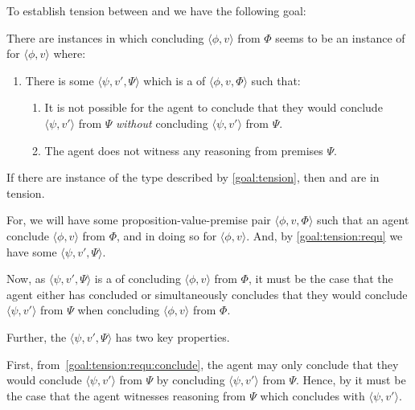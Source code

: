 \begin{note}[Goal]
  To establish tension between \ESU{} and \csN{} we have the following goal:

  \begin{goal}
    \label{goal:tension}
    There are instances in which concluding \(\langle \phi,v \rangle\) from \(\Phi\) seems to be an instance of \csN{} for \(\langle \phi,v \rangle\) where:
    \begin{enumerate}[label=\arabic*., ref=\named{G\ref{goal:tension}:\arabic*}]
    \item
      \label{goal:tension:requ}
      There is some \(\langle \psi,v',\Psi \rangle\) which is a \requ{} of \(\langle \phi,v,\Phi \rangle\) such that:
      \begin{enumerate}[label=\alph*., ref=\named{G\ref{goal:tension}:1\alph*}]
      \item
        \label{goal:tension:requ:conclude}
        It is not possible for the agent to conclude that they would conclude \(\langle \psi,v' \rangle\) from \(\Psi\) \emph{without} concluding \(\langle \psi,v' \rangle\) from \(\Psi\).
      \item
        \label{goal:tension:requ:no-reason}
        The agent does not witness any reasoning from premises \(\Psi\).
      \end{enumerate}
    \end{enumerate}
    \vspace{-\baselineskip}
  \end{goal}

  If there are instance of the type described by \autoref{goal:tension}, then \ESU{} and \csN{} are in tension.

  For, we will have some proposition-value-premise pair \(\langle \phi,v,\Phi \rangle\) such that an agent conclude \(\langle \phi,v \rangle\) from \(\Phi\), and in doing so \csV{} for \(\langle \phi,v \rangle\).
  And, by \autoref{goal:tension:requ} we have some \requ{} \(\langle \psi,v',\Psi \rangle\).

  Now, as \(\langle \psi,v',\Psi \rangle\) is a  of concluding \(\langle \phi,v \rangle\) from \(\Phi\), it must be the case that the agent either has concluded or simultaneously concludes that they would conclude \(\langle \psi,v' \rangle\) from \(\Psi\) when concluding \(\langle \phi,v \rangle\) from \(\Phi\).

  Further, the \requ{} \(\langle \psi,v',\Psi \rangle\) has two key properties.

  First, from~\autoref{goal:tension:requ:conclude}, the agent may only conclude that they would conclude \(\langle \psi,v' \rangle\) from \(\Psi\) by concluding \(\langle \psi,v' \rangle\) from \(\Psi\).
  Hence, by \ESU{} it must be the case that the agent witnesses reasoning from \(\Psi\) which concludes with \(\langle \psi,v' \rangle\).


\end{note}
